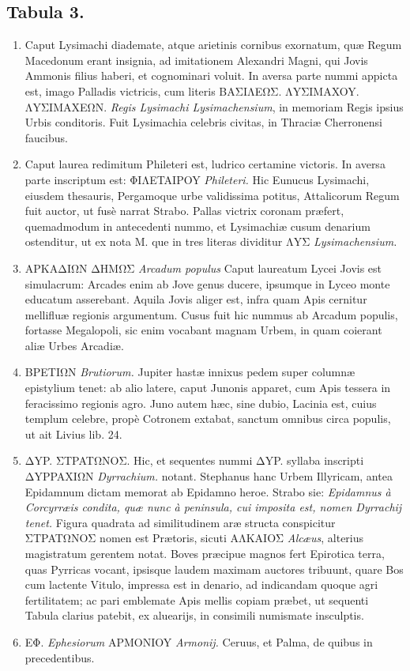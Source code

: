 \documentclass[a4paper, 11pt, oneside, polutonikogreek, latin]{article}
\begin{document}
\subsection*{Tabula 3.}
\begin{enumerate}
    \item Caput Lysimachi diademate, atque arietinis cornibus exornatum, quæ Regum Macedonum erant insignia, ad imitationem Alexandri Magni, qui Jovis Ammonis filius haberi, et cognominari voluit. In aversa parte nummi appicta est, imago Palladis victricis, cum literis BAΣIΛEΩΣ. ΛYΣIMAXOY. ΛYΣIMAXEΩN. \emph{Regis Lysimachi Lysimachensium}, in memoriam Regis ipsius Urbis conditoris. Fuit Lysimachia celebris civitas, in Thraciæ Cherronensi faucibus.

    \item Caput laurea redimitum Phileteri est, ludrico certamine victoris. In aversa parte inscriptum est: ΦIΛETAIPOY \emph{Phileteri.} Hic Eunucus Lysimachi, eiusdem thesauris, Pergamoque urbe validissima potitus, Attalicorum Regum fuit auctor, ut fusè narrat Strabo. Pallas victrix coronam præfert, quemadmodum in antecedenti nummo, et Lysimachiæ cusum denarium ostenditur, ut ex nota M. que in tres literas dividitur ΛYΣ \emph{Lysimachensium.}

    \item APKAΔIΩN ΔHMΩΣ \emph{Arcadum populus} Caput laureatum Lycei Jovis est simulacrum: Arcades enim ab Jove genus ducere, ipsumque in Lyceo monte educatum asserebant. Aquila Jovis aliger est, infra quam Apis cernitur mellifluæ regionis argumentum. Cusus fuit hic nummus ab Arcadum populis, fortasse Megalopoli, sic enim vocabant magnam Urbem, in quam coierant aliæ Urbes Arcadiæ.

    \item BPETIΩN \emph{Brutiorum.} Jupiter hastæ innixus pedem super columnæ epistylium tenet: ab alio latere, caput Junonis apparet, cum Apis tessera in feracissimo regionis agro. Juno autem hæc, sine dubio, Lacinia est, cuius templum celebre, propè Cotronem extabat, sanctum omnibus circa populis, ut ait Livius lib. 24.

    \item ΔYP. ΣTPATΩNOΣ. Hic, et sequentes nummi ΔYP. syllaba inscripti\\ ΔYPPAXIΩN \emph{Dyrrachium.} notant. Stephanus hanc Urbem Illyricam, antea Epidamnum dictam memorat ab Epidamno heroe. Strabo sie: \emph{Epidamnus à Corcyrræis condita, quæ nunc à peninsula, cui imposita est, nomen Dyrrachij tenet.} Figura quadrata ad similitudinem aræ structa conspicitur ΣTPATΩNOΣ nomen est Prætoris, sicuti AΛKAIOΣ \emph{Alcæus}, alterius magistratum gerentem notat. Boves præcipue magnos fert Epirotica terra, quas Pyrricas vocant, ipsisque laudem maximam auctores tribuunt, quare Bos cum lactente Vitulo, impressa est in denario, ad indicandam quoque agri fertilitatem; ac pari emblemate Apis mellis copiam præbet, ut sequenti Tabula clarius patebit, ex aluearijs, in consimili numismate insculptis.

    \item EΦ. \emph{Ephesiorum} APMONIOY \emph{Armonij.} Ceruus, et Palma, de quibus in precedentibus.
\end{enumerate}
\end{document}
